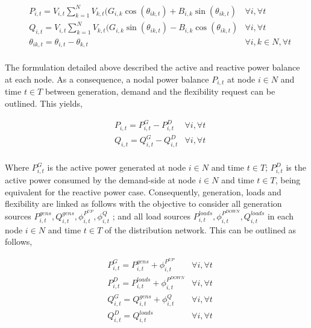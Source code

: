 \begin{subequations}
\begin{align*}
& P_{i,t} = V_{i,t} \sum_{k=1}^{N} V_{k,t} (G_{i,k} \cos(\theta_{ik,t}) + B_{i,k} \sin(\theta_{ik,t}) & \forall i,\forall t  \\ 
& Q_{i,t} = V_{i,t} \sum_{k=1}^{N} V_{k,t} (G_{i,k} \sin(\theta_{ik,t}) - B_{i,k} \cos(\theta_{ik,t}) & \forall i,\forall t \\
& \theta_{ik,t} = \theta_{i,t} - \theta_{k,t} 															& \forall i,k \in N, \forall t \\
\end{align*}
\end{subequations}

The formulation detailed above described the active and reactive power balance at each node. As a consequence, a nodal power balance $P_{i,t}$ at node $i \in N$ and time $t \in T$ between generation, demand and the flexibility request can be outlined. This yields, 

\begin{subequations}
\begin{align*}
& P_{i,t} = P_{i,t}^{G} - P_{i,t}^{D}   & \forall i,\forall t \\
& Q_{i,t} = Q_{i,t}^{G} - Q_{i,t}^{D}   & \forall i,\forall t \\
\end{align*}
\end{subequations}

Where $P_{i,t}^{G}$ is the active power generated at node $i \in N$ and time $t \in T$; $P_{i,t}^{D}$ is the active power consumed by the demand-side at node $i \in N$ and time $t \in T$, being equivalent for the reactive power case. Consequently, generation, loads and flexibility are linked as follows with the objective to consider all generation sources $P_{i,t}^{gens}, Q_{i,t}^{gens}, \phi_{i,t}^{P^{UP}},\phi_{i,t}^{Q}$ ; and all load sources $P_{i,t}^{loads},\phi_{i,t}^{P^{DOWN}}, Q_{i,t}^{loads}$ in each node $i \in N$ and time $t \in T$ of the distribution network. This can be outlined as follows,

\begin{subequations}
\begin{align*}
& P_{i,t}^{G} = P_{i,t}^{gens} + \phi_{i,t}^{P^{UP}}    & \forall i,\forall t \\
& P_{i,t}^{D} = P_{i,t}^{loads} + \phi_{i,t}^{P^{DOWN}} & \forall i,\forall t \\
& Q_{i,t}^{G} = Q_{i,t}^{gens} + \phi_{i,t}^{Q}    & \forall i,\forall t\\
& Q_{i,t}^{D} = Q_{i,t}^{loads}  & \forall i,\forall t 
\end{align*}
\end{subequations}

